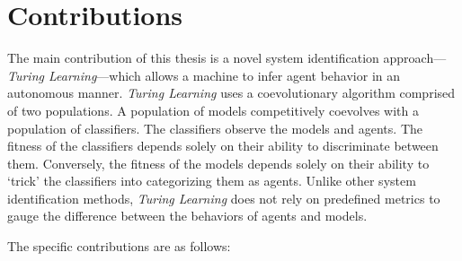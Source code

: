
\section{Contributions}

The main contribution of this thesis is a novel system identification approach---\textit{Turing Learning}---which allows a machine to infer agent behavior in an autonomous manner. \textit{Turing Learning} uses a coevolutionary algorithm comprised of two populations. A population of models competitively coevolves with a population of classifiers. The classifiers observe the models and agents. The fitness of the classifiers depends solely on their ability to discriminate between them. Conversely, the fitness of the models depends solely on their ability to `trick' the classifiers into categorizing them as agents. Unlike other system identification methods, \textit{Turing Learning} does not rely on predefined metrics to gauge the difference between the behaviors of agents and models. 

The specific contributions are as follows:

